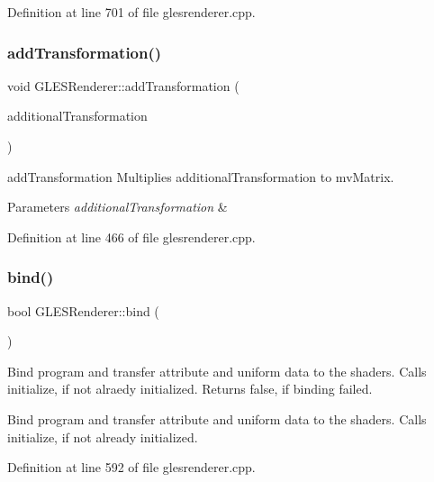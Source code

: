 Definition at line 701 of file glesrenderer.\+cpp.

\mbox{\label{class_g_l_e_s_renderer_a5a523cfef1b63258e863af159c04c235}} 
\subsubsection{\texorpdfstring{addTransformation()}{addTransformation()}}
{\footnotesize\ttfamily void G\+L\+E\+S\+Renderer\+::add\+Transformation (\begin{DoxyParamCaption}\item[{const Q\+Matrix4x4}]{additional\+Transformation }\end{DoxyParamCaption})}



add\+Transformation Multiplies additional\+Transformation to mv\+Matrix. 


\begin{DoxyParams}{Parameters}
{\em additional\+Transformation} & \\
\hline
\end{DoxyParams}


Definition at line 466 of file glesrenderer.\+cpp.

\mbox{\label{class_g_l_e_s_renderer_a41d040c7fa439552abf339b3883b02f4}} 
\subsubsection{\texorpdfstring{bind()}{bind()}}
{\footnotesize\ttfamily bool G\+L\+E\+S\+Renderer\+::bind (\begin{DoxyParamCaption}{ }\end{DoxyParamCaption})\hspace{0.3cm}{\ttfamily [virtual]}}

Bind program and transfer attribute and uniform data to the shaders. Calls initialize, if not alraedy initialized. Returns false, if binding failed.

Bind program and transfer attribute and uniform data to the shaders. Calls initialize, if not already initialized. 

Definition at line 592 of file glesrenderer.\+cpp.

